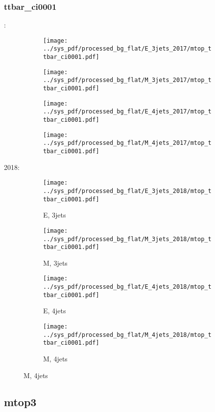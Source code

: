 \documentclass{beamer}
\begin{document}
\begin{frame}
\frametitle{ttbar_ci0001}
\fontsize{5}{1}:
\begin{figure}
\centering
\begin{subfigure}[b]{0.24\textwidth}
\texttt{[image: ../sys\_pdf/processed\_bg\_flat/E\_3jets\_2017/mtop\_ttbar\_ci0001.pdf]}
\end{subfigure}
\begin{subfigure}[b]{0.24\textwidth}
\texttt{[image: ../sys\_pdf/processed\_bg\_flat/M\_3jets\_2017/mtop\_ttbar\_ci0001.pdf]}
\end{subfigure}
\begin{subfigure}[b]{0.24\textwidth}
\texttt{[image: ../sys\_pdf/processed\_bg\_flat/E\_4jets\_2017/mtop\_ttbar\_ci0001.pdf]}
\end{subfigure}
\begin{subfigure}[b]{0.24\textwidth}
\texttt{[image: ../sys\_pdf/processed\_bg\_flat/M\_4jets\_2017/mtop\_ttbar\_ci0001.pdf]}
\end{subfigure}
\end{figure}
2018:
\begin{figure}
\centering
\begin{subfigure}[b]{0.24\textwidth}
\texttt{[image: ../sys\_pdf/processed\_bg\_flat/E\_3jets\_2018/mtop\_ttbar\_ci0001.pdf]}
\captionsetup{font=tiny}
\caption{E, 3jets}
\end{subfigure}
\begin{subfigure}[b]{0.24\textwidth}
\texttt{[image: ../sys\_pdf/processed\_bg\_flat/M\_3jets\_2018/mtop\_ttbar\_ci0001.pdf]}
\captionsetup{font=tiny}
\caption{M, 3jets}
\end{subfigure}
\begin{subfigure}[b]{0.24\textwidth}
\texttt{[image: ../sys\_pdf/processed\_bg\_flat/E\_4jets\_2018/mtop\_ttbar\_ci0001.pdf]}
\captionsetup{font=tiny}
\caption{E, 4jets}
\end{subfigure}
\begin{subfigure}[b]{0.24\textwidth}
\texttt{[image: ../sys\_pdf/processed\_bg\_flat/M\_4jets\_2018/mtop\_ttbar\_ci0001.pdf]}
\captionsetup{font=tiny}
\caption{M, 4jets}
\end{subfigure}
\end{figure}
\end{frame}


\subsection{mtop3}
\end{document}
